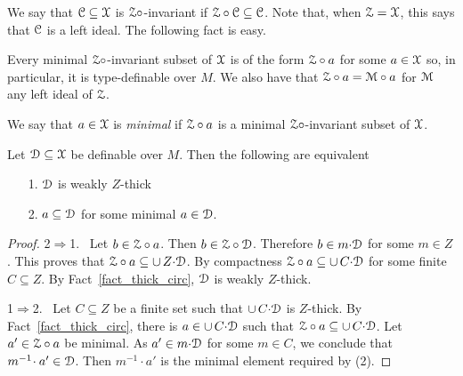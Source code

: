We say that $\EuScript C\subseteq\EuScript X$ is $\EuScript Z{\circ}$-invariant if $\EuScript Z\circ\EuScript C\subseteq\EuScript C$.
Note that, when $\EuScript Z=\EuScript X$, this says that $\EuScript C$ is a left ideal.
The following fact is easy.

\begin{fact}
  Every minimal $\EuScript Z{\circ}$-invariant subset of $\EuScript X$ is of the form $\EuScript Z\circ a$ for some $a\in\EuScript X$ so, in particular, it is type-definable over $M$.
  We also have that $\EuScript Z\circ a=\EuScript M\circ a$ for $\EuScript M$ any left ideal of $\EuScript Z$.
\end{fact}

We say that $a\in\EuScript X$ is \emph{minimal\/} if $\EuScript Z\circ a$ is a minimal $\EuScript Z{\circ}$-invariant subset of $\EuScript X$.

\begin{theorem}
  Let $\EuScript D\subseteq\EuScript X$ be definable over $M$.
  Then the following are equivalent
  \begin{itemize}
    \item [1.] $\EuScript D$ is weakly $Z$-thick
    \item [2.] $a\subseteq\EuScript D$ for some minimal $a\in\EuScript D$.
  \end{itemize}
\end{theorem}

\begin{proof}
  2$\Rightarrow$1. \ 
  Let $b\in\EuScript Z\circ a$.
  Then $b\in\EuScript Z\circ\EuScript D$.
  Therefore $b\in m{\cdot}\EuScript D$ for some $m\in Z$.
  This proves that $\EuScript Z\circ a\subseteq\cup\,Z{\cdot}\EuScript D$.
  By compactness $\EuScript Z\circ a\subseteq\cup\,C{\cdot}\EuScript D$ for some finite $C\subseteq Z$.
  By Fact~\ref{fact_thick_circ}, $\EuScript D$ is weakly $Z$-thick.

  1$\Rightarrow$2. \ 
  Let $C\subseteq Z$ be a finite set such that $\cup\,C{\cdot}\EuScript D$ is $Z$-thick.
  By Fact~\ref{fact_thick_circ}, there is $a\in\cup\,C{\cdot}\EuScript D$ such that $\EuScript Z\circ a\subseteq\cup\,C{\cdot}\EuScript D$.
  Let $a'\in\EuScript Z\circ a$ be minimal.
  As $a'\in m{\cdot}\EuScript D$ for some $m\in C$, we conclude that $m^{-1}\!\cdot a'\in\EuScript D$.
  Then $m^{-1}\!\cdot a'$ is the minimal element required by (2).
\end{proof}



